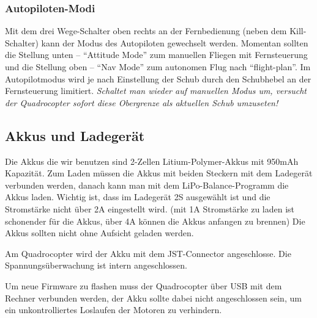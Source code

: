 \subsubsection{Autopiloten-Modi}
Mit dem drei Wege-Schalter oben rechts an der Fernbedienung (neben dem Kill-Schalter) kann der Modus des Autopiloten gewechselt werden.
Momentan sollten die Stellung unten – \enquote{Attitude Mode} zum manuellen Fliegen mit Fernsteuerung und die Stellung oben – \enquote{Nav Mode} zum autonomen Flug nach \enquote{flight-plan}.
Im Autopilotmodus wird je nach Einstellung der Schub durch den Schubhebel an der Fernsteuerung limitiert. \emph{Schaltet man wieder auf manuellen Modus um, versucht der Quadrocopter sofort diese Obergrenze als aktuellen Schub umzuseten!}

\subsection{Akkus und Ladegerät}
Die Akkus die wir benutzen sind 2-Zellen Litium-Polymer-Akkus mit 950mAh Kapazität.
Zum Laden müssen die Akkus mit beiden Steckern mit dem Ladegerät verbunden werden, danach kann man mit dem LiPo-Balance-Programm die Akkus laden.
Wichtig ist, dass im Ladegerät 2S ausgewählt ist und die Stromstärke nicht über 2A eingestellt wird.
(mit 1A Stromstärke zu laden ist schonender für die Akkus, über 4A können die Akkus anfangen zu brennen)
Die Akkus sollten nicht ohne Aufsicht geladen werden.

Am Quadrocopter wird der Akku mit dem JST-Connector angeschlosse. Die Spannungsüberwachung ist intern angeschlossen.

Um neue Firmware zu flashen muss der Quadrocopter über USB mit dem Rechner verbunden werden, der Akku sollte dabei nicht angeschlossen sein, um ein unkontrolliertes Loslaufen der Motoren zu verhindern.

